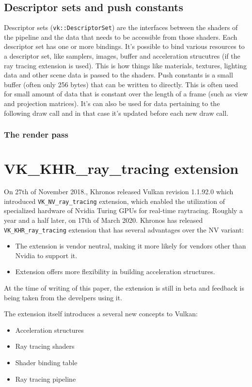 \documentclass[times, utf8, zavrsni, numeric]{fer}
\begin{document}
\subsection{Descriptor sets and push constants}
Descriptor sets (\texttt{vk::DescriptorSet}) are the interfaces between the shaders of the pipeline and the data that needs to be accessible from those shaders. Each descriptor set has one or more bindings. It's possible to bind various resources to a descriptor set, like samplers, images, buffer and acceleration strucutres (if the ray tracing extension is used). This is how things like materials, textures, lighting data and other scene data is passed to the shaders.
Push constants is a small buffer (often only 256 bytes) that can be written to directly. This is often used for small amount of data that is constant over the length of a frame (such as view and projection matrices). It's can also be used for data pertaining to the following draw call and in that case it's updated before each new draw call.

\subsubsection{The render pass}

\section{VK\_KHR\_ray\_tracing extension}
On 27th of November 2018., Khronos released Vulkan revision 1.1.92.0 which introduced \texttt{VK\_NV\_ray\_tracing} extension, which enabled the utilization of specialized hardware of Nvidia Turing GPUs for real-time raytracing. Roughly a year and a half later, on 17th of March 2020. Khronos has released \texttt{VK\_KHR\_ray\_tracing} extension that has several advantages over the NV variant:
\begin{itemize}
	\item{The extension is vendor neutral, making it more likely for vendors other than Nvidia to support it.}
	\item{Extension offers more flexibility in building acceleration structures.}
\end{itemize}

At the time of writing of this paper, the extension is still in beta and feedback is being taken from the develpers using it.

The extension itself introduces a several new concepts to Vulkan:
\begin{itemize}
	\item{Acceleration structures}
	\item{Ray tracing shaders}
	\item{Shader binding table}
	\item{Ray tracing pipeline}
\end{itemize}
\end{document}
